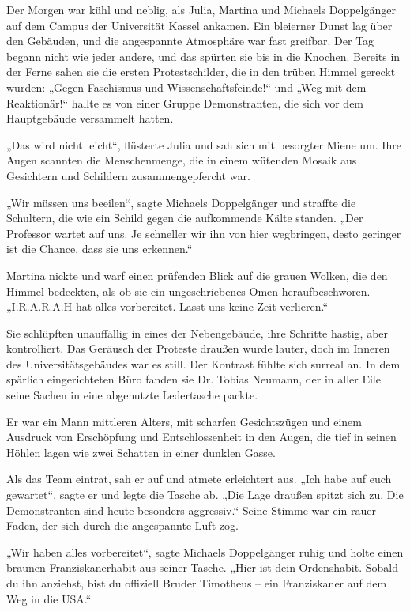 \documentclass[
]{article}
\begin{document}
Der Morgen war kühl und neblig, als Julia, Martina und Michaels
Doppelgänger auf dem Campus der Universität Kassel ankamen. Ein
bleierner Dunst lag über den Gebäuden, und die angespannte Atmosphäre
war fast greifbar. Der Tag begann nicht wie jeder andere, und das
spürten sie bis in die Knochen. Bereits in der Ferne sahen sie die
ersten Protestschilder, die in den trüben Himmel gereckt wurden: „Gegen
Faschismus und Wissenschaftsfeinde!{\kern0pt}`` und „Weg mit dem
Reaktionär!{\kern0pt}`` hallte es von einer Gruppe Demonstranten, die
sich vor dem Hauptgebäude versammelt hatten.

„Das wird nicht leicht``, flüsterte Julia und sah sich mit besorgter
Miene um. Ihre Augen scannten die Menschenmenge, die in einem wütenden
Mosaik aus Gesichtern und Schildern zusammengepfercht war.

„Wir müssen uns beeilen``, sagte Michaels Doppelgänger und straffte die
Schultern, die wie ein Schild gegen die aufkommende Kälte standen. „Der
Professor wartet auf uns. Je schneller wir ihn von hier wegbringen,
desto geringer ist die Chance, dass sie uns erkennen.``

Martina nickte und warf einen prüfenden Blick auf die grauen Wolken, die
den Himmel bedeckten, als ob sie ein ungeschriebenes Omen
heraufbeschworen. „I.R.A.R.A.H hat alles vorbereitet. Lasst uns keine
Zeit verlieren.``

Sie schlüpften unauffällig in eines der Nebengebäude, ihre Schritte
hastig, aber kontrolliert. Das Geräusch der Proteste draußen wurde
lauter, doch im Inneren des Universitätsgebäudes war es still. Der
Kontrast fühlte sich surreal an. In dem spärlich eingerichteten Büro
fanden sie Dr. Tobias Neumann, der in aller Eile seine Sachen in eine
abgenutzte Ledertasche packte.

Er war ein Mann mittleren Alters, mit scharfen Gesichtszügen und einem
Ausdruck von Erschöpfung und Entschlossenheit in den Augen, die tief in
seinen Höhlen lagen wie zwei Schatten in einer dunklen Gasse.

Als das Team eintrat, sah er auf und atmete erleichtert aus. „Ich habe
auf euch gewartet``, sagte er und legte die Tasche ab. „Die Lage draußen
spitzt sich zu. Die Demonstranten sind heute besonders aggressiv.``
Seine Stimme war ein rauer Faden, der sich durch die angespannte Luft
zog.

„Wir haben alles vorbereitet``, sagte Michaels Doppelgänger ruhig und
holte einen braunen Franziskanerhabit aus seiner Tasche. „Hier ist dein
Ordenshabit. Sobald du ihn anziehst, bist du offiziell Bruder Timotheus
-- ein Franziskaner auf dem Weg in die USA.``
\end{document}
